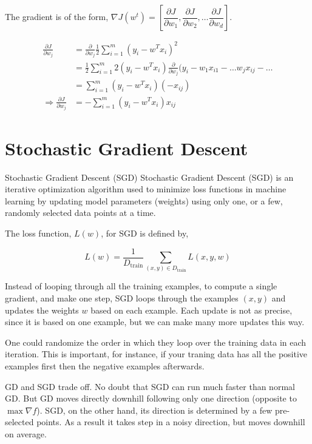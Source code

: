 \documentclass{article}
\newcounter{solution}
\begin{document}
	\begin{solution}
		The gradient is of the form, \(\nabla J(w^t)=\left[\dfrac{\partial J}{\partial w_1},\dfrac{\partial J}{\partial w_2},\hdots\dfrac{\partial J}{\partial w_d}\right]\).
		
		\begin{align*}
			\frac{\partial J}{\partial w_j}&=\frac{\partial}{\partial w_j}\frac12\sum_{i=1}^m(y_i-w^Tx_i)^2\\
			&=\frac12 \sum_{i=1}^{m}2(y_i-w^Tx_i)\frac{\partial}{\partial w_j}(y_i-w_1x_{i1}-\hdots w_jx_{ij}-\hdots\\
			&=\sum_{i=1}^m(y_i-w^Tx_i)(-x_{ij})\\
			\Rightarrow \frac{\partial J}{\partial w_j} &=- \sum_{i=1}^m(y_i-w^Tx_i)x_{ij}
		\end{align*}
	\end{solution}

	\section{Stochastic Gradient Descent}
	
	\begin{definition}{Stochastic Gradient Descent (SGD)}
		Stochastic Gradient Descent (SGD) is an iterative optimization algorithm used to minimize loss functions in machine learning by updating model parameters (weights) using only one, or a few, randomly selected data points at a time.
	\end{definition}

	The loss function, \(L(w)\), for SGD is defined by,

	\begin{equation}\label{eq:4}
		L(w)=\frac1{D_\text{train}}\sum_{(x,y)\in D_\text{train}}L(x,y,w)
	\end{equation}

	Instead of looping through all the training examples, to compute a single gradient, and make one step, SGD loops through the examples \((x,y)\) and updates the weights \(w\) based on each example. Each update is not as precise, since it is based on one example, but we can make many more updates this way.
	
	One could randomize the order in which they loop over the training data in each iteration. This is important, for instance, if your traning data has all the positive examples first then the negative examples afterwards.
	
	\begin{info}{GD and SGD trade off.}
		No doubt that SGD can run much faster than normal GD. But GD moves directly downhill following only one direction (opposite to \(\max \nabla f\)). SGD, on the other hand, its direction is determined by a few pre-selected points. As a result it takes step in a noisy direction, but moves downhill on average.
	\end{info}
	
\end{document}
